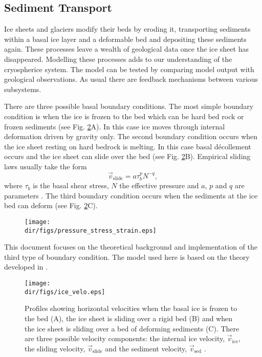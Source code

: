 \subsection{Sediment Transport}\label{erosion.sec.full_trans}
Ice sheets and glaciers modify their beds by eroding it, transporting sediments within a basal ice layer and a deformable bed and depositing these sediments again. These processes leave a wealth of geological data once the ice sheet has disappeared. Modelling these processes adds to our understanding of the cryospherice system. The model can be tested by comparing model output with geological observations. As usual there are feedback mechanisms between various subsystems.

There are three possible basal boundary conditions. The most simple boundary condition is when the ice is frozen to the bed which can be hard bed rock or frozen sediments (see Fig. \ref{erosion.fig.velos}A). In this case ice moves through internal deformation driven by gravity only.  The second boundary condition occurs when the ice sheet resting on hard bedrock is melting. In this case basal d\'ecollement occurs and the ice sheet can slide over the bed (see Fig. \ref{erosion.fig.velos}B). Empirical sliding laws usually take the form
\begin{equation}
  \vec{v}_{\text{slide}} = a\tau_b^pN^{-q},
\end{equation}
where $\tau_b$ is the basal shear stress, $N$ the effective pressure and $a$, $p$ and $q$ are parameters \citep{Paterson1994}. The third boundary condition occurs when the sediments at the ice bed can deform (see Fig. \ref{erosion.fig.velos}C).

\begin{figure}[htbp]
  \centering
  \texttt{[image: \\dir/figs/pressure\_stress\_strain.eps]}
  \label{fig.stress_etc}
\end{figure}

This document focuses on the theoretical background and implementation of the third type of boundary condition. The model used here is based on the theory developed in \citet{Boulton1996a}. 

\begin{figure}[htbp]
  \centering
  \texttt{[image: \\dir/figs/ice\_velo.eps]} 
  \caption{Profiles showing horizontal velocities when the basal ice is frozen to the bed (A), the ice sheet is sliding over a rigid bed (B) and when the ice sheet is sliding over a bed of deforming sediments (C). There are three possible velocity components: the internal ice velocity, $\vec{v}_{\text{ice}}$, the sliding velocity, $\vec{v}_{\text{slide}}$ and the sediment velocity, $\vec{v}_{\text{sed}}$ \citep[after][]{Boulton1996a}.}
  \label{erosion.fig.velos}
\end{figure}

